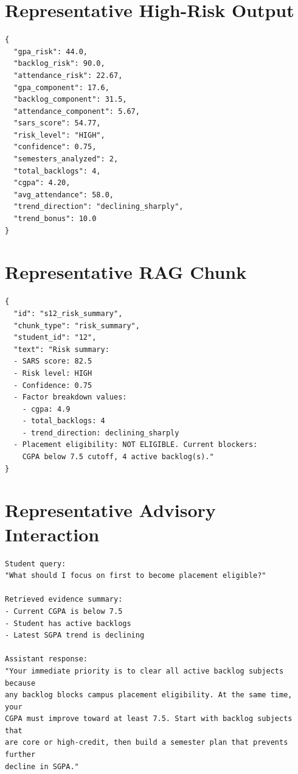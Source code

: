 \section{Representative High-Risk Output}
\begin{lstlisting}[style=sarscode,caption={Illustrative High-Risk Analytical Case}]
{
  "gpa_risk": 44.0,
  "backlog_risk": 90.0,
  "attendance_risk": 22.67,
  "gpa_component": 17.6,
  "backlog_component": 31.5,
  "attendance_component": 5.67,
  "sars_score": 54.77,
  "risk_level": "HIGH",
  "confidence": 0.75,
  "semesters_analyzed": 2,
  "total_backlogs": 4,
  "cgpa": 4.20,
  "avg_attendance": 58.0,
  "trend_direction": "declining_sharply",
  "trend_bonus": 10.0
}
\end{lstlisting}

\section{Representative RAG Chunk}
\begin{lstlisting}[style=sarscode,caption={Illustrative Retrieved Student Chunk}]
{
  "id": "s12_risk_summary",
  "chunk_type": "risk_summary",
  "student_id": "12",
  "text": "Risk summary:
  - SARS score: 82.5
  - Risk level: HIGH
  - Confidence: 0.75
  - Factor breakdown values:
    - cgpa: 4.9
    - total_backlogs: 4
    - trend_direction: declining_sharply
  - Placement eligibility: NOT ELIGIBLE. Current blockers:
    CGPA below 7.5 cutoff, 4 active backlog(s)."
}
\end{lstlisting}

\section{Representative Advisory Interaction}
\begin{lstlisting}[style=sarscode,caption={Illustrative Advisory Exchange}]
Student query:
"What should I focus on first to become placement eligible?"

Retrieved evidence summary:
- Current CGPA is below 7.5
- Student has active backlogs
- Latest SGPA trend is declining

Assistant response:
"Your immediate priority is to clear all active backlog subjects because
any backlog blocks campus placement eligibility. At the same time, your
CGPA must improve toward at least 7.5. Start with backlog subjects that
are core or high-credit, then build a semester plan that prevents further
decline in SGPA."
\end{lstlisting}

